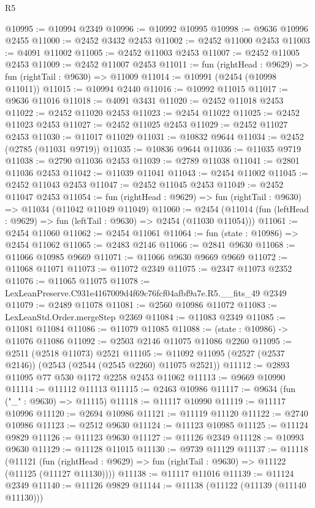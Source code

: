 \begin{lexlean}{R5}
\begin{coremodule}
@10995 := @10994 @2349
@10996 := @10992 @10995
@10998 := @9636 @10996 @2455
@11000 := @2452 @3432 @2453
@11002 := @2452 @11000 @2453
@11003 := @4091 @11002
@11005 := @2452 @11003 @2453
@11007 := @2452 @11005 @2453
@11009 := @2452 @11007 @2453
@11011 := fun (rightHead : @9629) => fun (rightTail : @9630) => @11009
@11014 := @10991 (@2454 (@10998 @11011))
@11015 := @10994 @2440
@11016 := @10992 @11015
@11017 := @9636 @11016
@11018 := @4091 @3431
@11020 := @2452 @11018 @2453
@11022 := @2452 @11020 @2453
@11023 := @2454 @11022
@11025 := @2452 @11023 @2453
@11027 := @2452 @11025 @2453
@11029 := @2452 @11027 @2453
@11030 := @11017 @11029
@11031 := @10832 @9644
@11034 := @2452 (@2785 (@11031 @9719))
@11035 := @10836 @9644
@11036 := @11035 @9719
@11038 := @2790 @11036 @2453
@11039 := @2789 @11038
@11041 := @2801 @11036 @2453
@11042 := @11039 @11041
@11043 := @2454 @11002
@11045 := @2452 @11043 @2453
@11047 := @2452 @11045 @2453
@11049 := @2452 @11047 @2453
@11054 := fun (rightHead : @9629) => fun (rightTail : @9630) => @11034 (@11042 @11049 @11049)
@11060 := @2454 (@11014 (fun (leftHead : @9629) => fun (leftTail : @9630) => @2454 (@11030 @11054)))
@11061 := @2454 @11060
@11062 := @2454 @11061
@11064 := fun (state : @10986) => @2454 @11062
@11065 := @2483 @2146
@11066 := @2841 @9630
@11068 := @11066 @10985 @9669
@11071 := @11066 @9630 @9669 @9669
@11072 := @11068 @11071
@11073 := @11072 @2349
@11075 := @2347 @11073 @2352
@11076 := @11065 @11075
@11078 := LexLeanPreserve.C931e4167009d4f69c76fcf04afbf9a7e.R5.__fits_49 @2349
@11079 := @2489 @11078
@11081 := @2560 @10986 @11072
@11083 := LexLeanStd.Order.mergeStep @2369
@11084 := @11083 @2349
@11085 := @11081 @11084
@11086 := @11079 @11085
@11088 := (state : @10986) -> @11076 @11086
@11092 := @2503 @2146 @11075 @11086 @2260
@11095 := @2511 (@2518 @11073) @2521
@11105 := @11092 @11095 (@2527 (@2537 @2146)) (@2543 (@2544 (@2545 @2260) @11075 @2521))
@11112 := @2893 @11095 @77 @530 @1172 @2258 @2453 @11062
@11113 := @9669 @10990
@11114 := @11112 @11113
@11115 := @2463 @10986
@11117 := @9634 (fun ("_" : @9630) => @11115)
@11118 := @11117 @10990
@11119 := @11117 @10996
@11120 := @2694 @10986
@11121 := @11119 @11120
@11122 := @2740 @10986
@11123 := @2512 @9630
@11124 := @11123 @10985
@11125 := @11124 @9829
@11126 := @11123 @9630
@11127 := @11126 @2349
@11128 := @10993 @9630
@11129 := @11128 @11015
@11130 := @9739 @11129
@11137 := @11118
    (@11121 (fun (rightHead : @9629) => fun (rightTail : @9630) => @11122 (@11125 (@11127 @11130))))
@11138 := @11117 @11016
@11139 := @11124 @2349
@11140 := @11126 @9829
@11144 := @11138 (@11122 (@11139 (@11140 @11130)))

\end{coremodule}
\end{lexlean}
